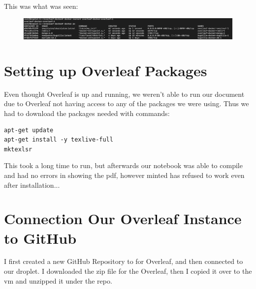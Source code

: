 This was what was seen:
\begin{figure}
    \centering
    \includegraphics[width=1.0\linewidth]{png/finally_fixed.png}
\end{figure}

\section{Setting up Overleaf Packages}
Even thought Overleaf is up and running, we weren't able to run our document due to Overleaf not having access to any of the packages we were using. Thus we had to download the packages needed with commands:
\begin{verbatim}
apt-get update
apt-get install -y texlive-full
mktexlsr
\end{verbatim}
This took a long time to run, but afterwards our notebook was able to compile and had no errors in showing the pdf, however minted has refused to work even after installation...

\section{Connection Our Overleaf Instance to GitHub}
I first created a new GitHub Repository to for Overleaf, and then connected to our droplet. I downloaded the zip file for the Overleaf, then I copied it over to the vm and unzipped it under the repo. 